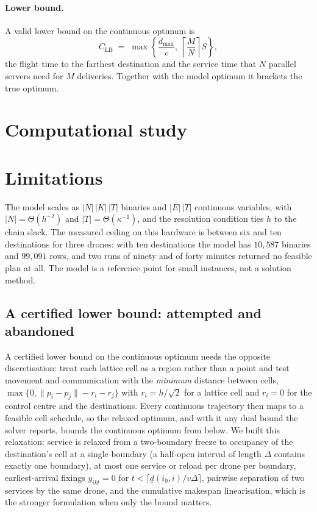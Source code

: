 \documentclass[11pt]{article}
\begin{document}
\paragraph{Lower bound.} A valid lower bound on the continuous optimum is
\[
  C_{\mathrm{LB}} \;=\; \max\!\left\{ \frac{d_{\max}}{v},\ \left\lceil \frac{M}{N} \right\rceil S \right\},
\]
the flight time to the farthest destination and the service time that $N$ parallel servers
need for $M$ deliveries. Together with the model optimum it brackets the true optimum.

\section{Computational study}



\section{Limitations}

The model scales as $|N|\,|K|\,|T|$ binaries and $|E|\,|T|$ continuous variables, with
$|N| = \Theta(h^{-2})$ and $|T| = \Theta(\kappa^{-1})$, and the resolution condition ties $h$
to the chain slack. The measured ceiling on this hardware is between six and ten destinations
for three drones: with ten destinations the model has $10{,}587$ binaries and $99{,}091$ rows,
and two runs of ninety and of forty minutes returned no feasible plan at all. The model is a
reference point for small instances, not a solution method.

\subsection*{A certified lower bound: attempted and abandoned}

A certified lower bound on the continuous optimum needs the opposite discretisation: treat each
lattice cell as a region rather than a point and test movement and communication with the
\emph{minimum} distance between cells, $\max\{0, \|p_i - p_j\| - r_i - r_j\}$ with
$r_i = h/\sqrt{2}$ for a lattice cell and $r_i = 0$ for the control centre and the destinations.
Every continuous trajectory then maps to a feasible cell schedule, so the relaxed optimum, and
with it any dual bound the solver reports, bounds the continuous optimum from below. We built
this relaxation: service is relaxed from a two-boundary freeze to occupancy of the destination's
cell at a single boundary (a half-open interval of length $\Delta$ contains exactly one boundary),
at most one service or reload per drone per boundary, earliest-arrival fixings
$y_{i k t} = 0$ for $t < \lceil \underline{d}(i_0,i)/v\Delta \rceil$, pairwise separation of two
services by the same drone, and the cumulative makespan linearisation, which is the stronger
formulation when only the bound matters.
\end{document}
